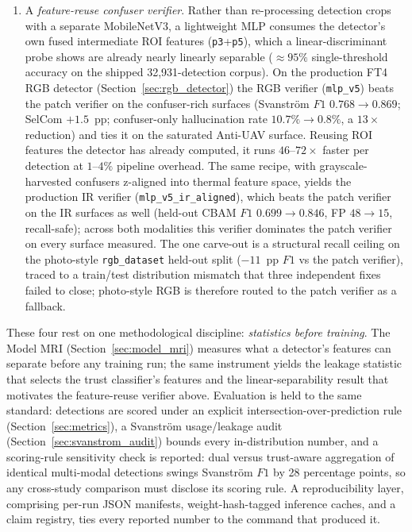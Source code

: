 \begin{enumerate}
    \item A \emph{feature-reuse confuser verifier}. Rather than re-processing detection crops with a separate MobileNetV3, a lightweight MLP consumes the detector's own fused intermediate ROI features (\texttt{p3}+\texttt{p5}), which a linear-discriminant probe shows are already nearly linearly separable ($\approx 95\%$ single-threshold accuracy on the shipped 32{,}931-detection corpus). On the production FT4 RGB detector (Section~\ref{sec:rgb_detector}) the RGB verifier (\texttt{mlp\_v5}) beats the patch verifier on the confuser-rich surfaces (Svanstr\"om $F1$ $0.768\to0.869$; SelCom $+1.5$~pp; confuser-only hallucination rate $10.7\%\to0.8\%$, a $13\times$ reduction) and ties it on the saturated Anti-UAV surface. Reusing ROI features the detector has already computed, it runs $46$--$72\times$ faster per detection at $1$--$4\%$ pipeline overhead. The same recipe, with grayscale-harvested confusers z-aligned into thermal feature space, yields the production IR verifier (\texttt{mlp\_v5\_ir\_aligned}), which beats the patch verifier on the IR surfaces as well (held-out CBAM $F1$ $0.699\to0.846$, FP $48\to15$, recall-safe); across both modalities this verifier dominates the patch verifier on every surface measured. The one carve-out is a structural recall ceiling on the photo-style \texttt{rgb\_dataset} held-out split ($-11$~pp $F1$ vs the patch verifier), traced to a train/test distribution mismatch that three independent fixes failed to close; photo-style RGB is therefore routed to the patch verifier as a fallback.
\end{enumerate}

These four rest on one methodological discipline: \emph{statistics before training}. The Model MRI (Section~\ref{sec:model_mri}) measures what a detector's features can separate before any training run; the same instrument yields the leakage statistic that selects the trust classifier's features and the linear-separability result that motivates the feature-reuse verifier above. Evaluation is held to the same standard: detections are scored under an explicit intersection-over-prediction rule (Section~\ref{sec:metrics}), a Svanstr\"om usage/leakage audit (Section~\ref{sec:svanstrom_audit}) bounds every in-distribution number, and a scoring-rule sensitivity check is reported: dual versus trust-aware aggregation of identical multi-modal detections swings Svanstr\"om $F1$ by 28 percentage points, so any cross-study comparison must disclose its scoring rule. A reproducibility layer, comprising per-run JSON manifests, weight-hash-tagged inference caches, and a claim registry, ties every reported number to the command that produced it.

